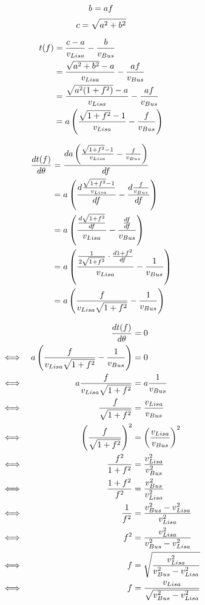 \documentclass[10pt]{article}
\begin{document}
\newpage

\[b=af\]
\[c=\sqrt{a^2+b^2}\]

\begin{align*}
t(f) &= \frac{c-a}{v_{Lisa}} - \frac{b}{v_{Bus}}\\
&= \frac{\sqrt{a^2+b^2}-a}{v_{Lisa}} - \frac{af}{v_{Bus}}\\
&= \frac{\sqrt{a^2(1+f^2)}-a}{v_{Lisa}} - \frac{af}{v_{Bus}}\\
&= a\left(\frac{\sqrt{1+f^2}-1}{v_{Lisa}} - \frac{f}{v_{Bus}}\right)\\
\end{align*}

\begin{align*}
\frac{dt(f)}{d\theta} &= \frac{da\left(\frac{\sqrt{1+f^2}-1}{v_{Lisa}} - \frac{f}{v_{Bus}}\right)}{df}\\
&= a\left(\frac{d\frac{\sqrt{1+f^2}-1}{v_{Lisa}}}{df} - \frac{d\frac{f}{v_{Bus}}}{df}\right)\\
&= a\left(\frac{\frac{d\sqrt{1+f^2}}{df}}{v_{Lisa}} - \frac{\frac{df}{df}}{v_{Bus}}\right)\\
&= a\left(\frac{\frac{1}{2\sqrt{1+f^2}}\cdot\frac{d1+f^2}{df}}{v_{Lisa}} - \frac{1}{v_{Bus}}\right)\\
&= a\left(\frac{f}{v_{Lisa}\sqrt{1+f^2}} - \frac{1}{v_{Bus}}\right)\\
\end{align*}

\begin{align*}
&&\frac{dt(f)}{d\theta} &= 0\\
\iff&&a\left(\frac{f}{v_{Lisa}\sqrt{1+f^2}} - \frac{1}{v_{Bus}}\right) &= 0\\
\iff&&a\frac{f}{v_{Lisa}\sqrt{1+f^2}} &= a\frac{1}{v_{Bus}}\\
\iff&&\frac{f}{\sqrt{1+f^2}} &= \frac{v_{Lisa}}{v_{Bus}}\\
\iff&&\left(\frac{f}{\sqrt{1+f^2}}\right)^2 &= \left(\frac{v_{Lisa}}{v_{Bus}}\right)^2\\
\iff&&\frac{f^2}{1+f^2} &= \frac{v_{Lisa}^2}{v_{Bus}^2}\\
\iff&&\frac{1+f^2}{f^2} &= \frac{v_{Bus}^2}{v_{Lisa}^2}\\
\iff&&\frac{1}{f^2} &= \frac{v_{Bus}^2-v_{Lisa}^2}{v_{Lisa}^2}\\
\iff&&f^2 &= \frac{v_{Lisa}^2}{v_{Bus}^2-v_{Lisa}^2}\\
\iff&&f &= \sqrt{\frac{v_{Lisa}^2}{v_{Bus}^2-v_{Lisa}^2}}\\
\iff&&f &= \frac{v_{Lisa}}{\sqrt{v_{Bus}^2-v_{Lisa}^2}}\\
\end{align*}
\end{document}
